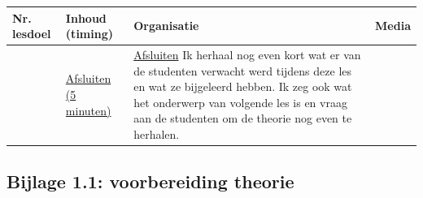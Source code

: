\begin{landscape}
%	
	
	

\begin{tabularx}{1.56\textwidth}{|p{1.5cm}|p{6cm}|X|p{4cm}|}
	\hline
	\textbf{Nr. lesdoel } & \textbf{Inhoud (timing)}  & \textbf{Organisatie } & \textbf{Media } \\ \hline
	&\underline{Afsluiten (5 minuten)}\newline 
	&  \underline{Afsluiten}\newline
	Ik herhaal nog even kort wat er van de studenten verwacht werd tijdens deze les en wat ze bijgeleerd hebben. Ik zeg ook wat het onderwerp van volgende les is en vraag aan de studenten om de theorie nog even te herhalen.
	& 
	\\ \hline
\end{tabularx}
	
	
	
	
\end{landscape}


\subsection*{Bijlage 1.1: voorbereiding theorie}

